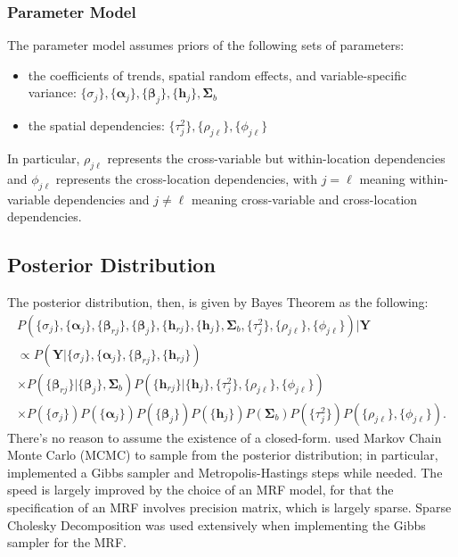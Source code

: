 \documentclass{article}
\begin{document}
\subsubsection{Parameter Model}
The parameter model assumes priors of the following sets of parameters: 
\begin{itemize}
    \item the coefficients of trends, spatial random effects, and variable-specific variance: $\{\sigma_j \}, \{\boldsymbol{\alpha}_j \}, \{\boldsymbol{\beta}_j \}, \{\boldsymbol{h}_j\}, \boldsymbol{\Sigma}_b$
    \item the spatial dependencies: $\{\tau_j^2\}, \{\rho_{j\ell}\}, \{\phi_{j\ell}\}$
\end{itemize} 
In particular, $\rho_{j\ell}$ represents the cross-variable but within-location dependencies and $\phi_{j\ell}$ represents the cross-location dependencies, with $j = \ell$ meaning within-variable dependencies and $j \ne \ell$ meaning cross-variable and cross-location dependencies. 

\subsection{Posterior Distribution}
The posterior distribution, then, is given by Bayes Theorem as the following:
\begin{eqnarray*}
    P(\{\sigma_j \}, \{\boldsymbol{\alpha}_j \}, \{\boldsymbol{\beta}_{rj} \}, \{\boldsymbol{\beta}_{j} \} ,  \{\boldsymbol{h}_{rj}\}, \{\boldsymbol{h}_{j}\}, \boldsymbol{\Sigma}_b, \{\tau_j^2\}, \{\rho_{j\ell}\}, \{\phi_{j\ell}\}) | \boldsymbol{Y} \\
    \propto P(\boldsymbol{Y} | \{\sigma_j \}, \{\boldsymbol{\alpha}_j \}, \{\boldsymbol{\beta}_{rj} \}, \{\boldsymbol{h}_{rj}\}) \\
    \times P(\{\boldsymbol{\beta}_{rj}\} |  \{\boldsymbol{\beta}_j \}, \boldsymbol{\Sigma}_b) P(\{\boldsymbol{h}_{rj}\} | \{\boldsymbol{h}_j \}, \{\tau^2_j \}, \{\rho_{j\ell} \}, \{\phi_{j\ell}\}) \\
    \times P(\{\sigma_j \})P(\{\boldsymbol{\alpha}_j \})P(\{\boldsymbol{\beta}_j \}) P(\{\boldsymbol{h}_j\}) P(\boldsymbol{\Sigma}_b) P(\{\tau_j^2\}) P(\{\rho_{j\ell}\}, \{\phi_{j\ell}\}).
\end{eqnarray*}
There's no reason to assume the existence of a closed-form. \cite{paper} used Markov Chain Monte Carlo (MCMC) to sample from the posterior distribution; in particular, \cite{paper} implemented a Gibbs sampler and Metropolis-Hastings steps while needed. The speed is largely improved by the choice of an MRF model, for that the specification of an MRF involves precision matrix, which is largely sparse. Sparse Cholesky Decomposition was used extensively when implementing the Gibbs sampler for the MRF.
\end{document}
